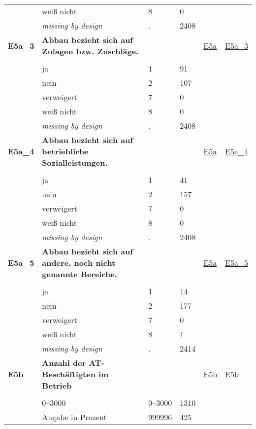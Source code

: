 \begin{longtable}{| L{2.45cm} | L{6cm} | C{1.5cm} | R{1cm} | C{2.25cm} | C{2.25cm} |}
   & weiß nicht & 8 & 0 &  &  \\ 
   & \textit{missing by design} & \textit{.} & 2408 &  &  \\ 
   \midrule
\textbf{E5a\_3}\label{var:E5a:3} & \textbf{Abbau bezieht sich auf Zulagen bzw. Zuschläge.} &  &  & \hyperref[E5a]{E5a} & \hyperref[var:suf:E5a:3]{E5a\_3} \\ 
   &  &  &  &  &  \\ 
   & ja & 1 & 91 &  &  \\ 
   & nein & 2 & 107 &  &  \\ 
   & verweigert & 7 & 0 &  &  \\ 
   & weiß nicht & 8 & 0 &  &  \\ 
   & \textit{missing by design} & \textit{.} & 2408 &  &  \\ 
   \midrule
\textbf{E5a\_4}\label{var:E5a:4} & \textbf{Abbau bezieht sich auf betriebliche Sozialleistungen.} &  &  & \hyperref[E5a]{E5a} & \hyperref[var:suf:E5a:4]{E5a\_4} \\ 
   &  &  &  &  &  \\ 
   & ja & 1 & 41 &  &  \\ 
   & nein & 2 & 157 &  &  \\ 
   & verweigert & 7 & 0 &  &  \\ 
   & weiß nicht & 8 & 0 &  &  \\ 
   & \textit{missing by design} & \textit{.} & 2408 &  &  \\ 
   \midrule
\textbf{E5a\_5}\label{var:E5a:5} & \textbf{Abbau bezieht sich auf andere, noch nicht genannte Bereiche.} &  &  & \hyperref[E5a]{E5a} & \hyperref[var:suf:E5a:5]{E5a\_5} \\ 
   &  &  &  &  &  \\ 
   & ja & 1 & 14 &  &  \\ 
   & nein & 2 & 177 &  &  \\ 
   & verweigert & 7 & 0 &  &  \\ 
   & weiß nicht & 8 & 1 &  &  \\ 
   & \textit{missing by design} & \textit{.} & 2414 &  &  \\ 
   \midrule
\textbf{E5b}\label{var:E5b} & \textbf{Anzahl der AT-Beschäftigten im Betrieb} &  &  & \hyperref[E5b]{E5b} & \hyperref[var:suf:E5b]{E5b} \\ 
   &  &  &  &  &  \\ 
   & 0--3000 & 0--3000 & 1310 &  &  \\ 
   & Angabe in Prozent & 999996 & 425 &  &  \\ 

\end{longtable}
